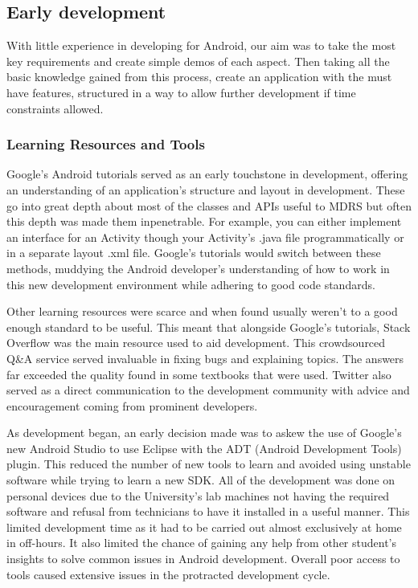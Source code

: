 \documentclass{l3proj}
\begin{document}
\subsection{Early development} With little experience in developing for Android,
our aim was to take the most key requirements and create simple demos of each
aspect. Then taking all the basic knowledge gained from this process, create an
application with the must have features, structured in a way to allow further development if time constraints allowed.

\subsubsection{Learning Resources and Tools} Google's Android tutorials served
as an early touchstone in development, offering an understanding of an
application's structure and layout in development. These go into great depth
about most of the classes and APIs useful to MDRS but often this depth was made
them inpenetrable. For example, you can either implement an interface for an
Activity though your Activity's .java file programmatically or in a separate
layout .xml file. Google's tutorials would switch between these methods,
muddying the Android developer's understanding of how to work in this new
development environment while adhering to good code standards.

Other learning resources were scarce and when found usually weren't to a good
enough standard to be useful. This meant that alongside Google's tutorials,
Stack Overflow was the main resource used to aid development. This crowdsourced
Q&A service served invaluable in fixing bugs and explaining topics. The answers
far exceeded the quality found in some textbooks that were used. Twitter also served as a direct communication to the development community with advice and encouragement coming from prominent developers.

As development began, an early decision made was to askew the use of Google's
new Android Studio to use Eclipse with the ADT (Android Development Tools)
plugin. This reduced the number of new tools to learn and avoided using unstable
software while trying to learn a new SDK. All of the development was done on
personal devices due to the University's lab machines not having the required
software and refusal from technicians to have it installed in a useful manner.
This limited development time as it had to be carried out almost exclusively at
home in off-hours. It also limited the chance of gaining any help from other
student's insights to solve common issues in Android development. Overall poor
access to tools caused extensive issues in the protracted  development cycle.
\end{document}
